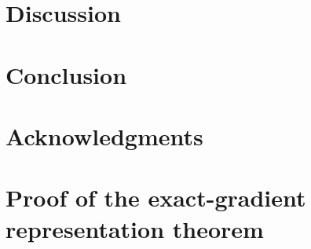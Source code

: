 \documentclass[aps,prb,10pt,twocolumn,superscriptaddress]{revtex4-2}
\begin{document}
\section{Discussion}


\section{Conclusion}



\section*{Acknowledgments}



\appendix

\section{Proof of the exact-gradient representation theorem}
\end{document}
